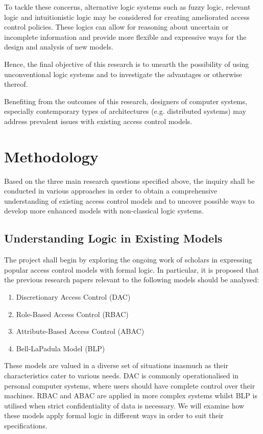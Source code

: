 \documentclass{article}
\begin{document}
To tackle these concerns, alternative logic systems such as fuzzy logic,
relevant logic and intuitionistic logic may be considered for creating
ameliorated access control policies. These logics can allow for reasoning
about uncertain or incomplete information and provide more flexible and
expressive ways for the design and analysis of new models.

Hence, the final objective of this research is to unearth the possibility
of using unconventional logic systems and to investigate the advantages or
otherwise thereof.

Benefiting from the outcomes of this research, designers of computer systems,
especially contemporary types of architectures (e.g. distributed systems)
may address prevalent issues with existing access control models.

\section*{Methodology}

Based on the three main research questions specified above, the inquiry
shall be conducted in various approaches in order to obtain a comprehensive
understanding of existing access control models and to uncover possible ways
to develop more enhanced models with non-classical logic systems.

\subsection*{Understanding Logic in Existing Models}

The project shall begin by exploring the ongoing work of scholars in
expressing popular access control models with formal logic. In particular,
it is proposed that the previous research papers relevant to the following
models should be analysed: \begin{enumerate}
    \item Discretionary Access Control (DAC) \item Role-Based Access Control
    (RBAC) \item Attribute-Based Access Control (ABAC) \item Bell-LaPadula
    Model (BLP)
\end{enumerate}

These models are valued in a diverse set of situations inasmuch as their
characteristics cater to various needs. DAC is commonly operationalised in
personal computer systems, where users should have complete control over
their machines. RBAC and ABAC are applied in more complex systems whilst
BLP is utilised when strict confidentiality of data is necessary. We will
examine how these models apply formal logic in different ways in order to
suit their specifications.
\end{document}
